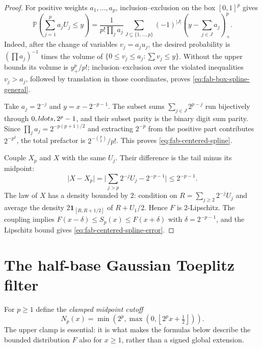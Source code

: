 \documentclass[11pt,oneside,openany]{book}
\theoremstyle{definition}
\theoremstyle{remark}
\newcommand{\one}{\mathbf 1}
\newcommand{\abs}[1]{\lvert #1\rvert}
\newcommand{\floor}[1]{\left\lfloor #1\right\rfloor}
\newcommand{\Prob}{\mathbb P}
\begin{document}
\begin{proof}
For positive weights $a_1,\ldots,a_p$, inclusion--exclusion on the box
$[0,1]^p$ gives
\begin{equation}
 \Prob\!\left(\sum_{j=1}^{p}a_jU_j\le y\right)
 =\frac1{p!\prod_ja_j}
  \sum_{J\subseteq\{1,\ldots,p\}}(-1)^{\abs J}
  \left(y-\sum_{j\in J}a_j\right)_+^p.
 \label{eq:fab-box-spline-general}
\end{equation}
Indeed, after the change of variables $v_j=a_ju_j$, the desired probability
is $(\prod a_j)^{-1}$ times the volume of
$\{0\le v_j\le a_j:\sum v_j\le y\}$.  Without the upper bounds its volume
is $y_+^p/p!$; inclusion--exclusion over the violated inequalities
$v_j>a_j$, followed by translation in those coordinates, proves
\eqref{eq:fab-box-spline-general}.

Take $a_j=2^{-j}$ and $y=x-2^{-p-1}$.  The subset sums
$\sum_{j\in J}2^{p-j}$ run bijectively through $0,\\ldots,2^p-1$, and their
subset parity is the binary digit sum parity.  Since
$\prod_ja_j=2^{-p(p+1)/2}$ and extracting $2^{-p}$ from the positive part
contributes $2^{-p^2}$, the total prefactor is
$2^{-\binom p2}/p!$.  This proves \eqref{eq:fab-centered-spline}.

Couple $X_p$ and $X$ with the same $U_j$.  Their difference is the tail
minus its midpoint:
\[
 \abs{X-X_p}
 =\abs{\sum_{j>p}2^{-j}U_j-2^{-p-1}}
 \le2^{-p-1}.
\]
The law of $X$ has a density bounded by $2$: condition on
$R=\sum_{j\ge2}2^{-j}U_j$ and average the density $2\one_{[R,R+1/2]}$ of
$R+U_1/2$.  Hence $F$ is $2$-Lipschitz.  The coupling implies
$F(x-\delta)\le S_p(x)\le F(x+\delta)$ with
$\delta=2^{-p-1}$, and the Lipschitz bound gives
\eqref{eq:fab-centered-spline-error}.
\end{proof}

\section{The half-base Gaussian Toeplitz filter}

For $p\ge1$ define the \emph{clamped midpoint cutoff}
\begin{equation}
 N_p(x)=
 \min\!\left(2^p,
   \max\!\left(0,\floor{2^px+\tfrac12}\right)\right).
 \label{eq:fab-clamped-cutoff}
\end{equation}
The upper clamp is essential: it is what makes the formulas below describe
the bounded distribution $F$ also for $x\ge1$, rather than a signed global
extension.
\end{document}
